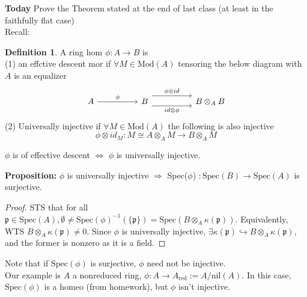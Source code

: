 \documentclass{article}
\theoremstyle{definition}
\theoremstyle{definition}
\newtheorem{definition}{Definition}[section]
\theoremstyle{remark}
\newcommand{\mk}[1]{\mathfrak{#1}}
\begin{document}
\textbf{Today} Prove the Theorem stated at the end of last class (at least in the faithfully flat case)\\

Recall: 
\begin{definition}
	A ring hom $\phi: A \to B$ is \\
	\indent(1) an effctive descent mor if $\forall M \in \text{Mod}(A)$ tensoring the below diagram with $A$ is an equalizer
\[\begin{tikzcd}
	A && B && {B \otimes_A B}
	\arrow["\phi", from=1-1, to=1-3]
	\arrow["{\phi \otimes id}", shift left=3, from=1-3, to=1-5]
	\arrow["{id \otimes\phi}"', shift right=2, from=1-3, to=1-5]
\end{tikzcd}\]
\indent (2) Universally injective if $\forall M \in \text{Mod}(A)$ the following is also injective
\[\phi \otimes id_M: M \cong A \otimes_A M \to B \otimes_A M\]
\end{definition}

\begin{theo}{}{}
	$\phi$ is of effective descent $\Longleftrightarrow$ $\phi$ is universally injective.
\end{theo}

\textbf{Proposition:} $\phi$ is universally injective $\Longrightarrow$ Spec($\phi$) $: \text{Spec}(B) \to \text{Spec}(A)$ is surjective.

\begin{proof}
	STS that for all $\mk{p} \in \text{Spec}(A), \emptyset \neq \text{Spec}(\phi)^{-1}(\{\mk{p}\}) = \text{Spec}(B \otimes_A \kappa(\mk{p}))$.
	Equivalently, WTS $B \otimes_A \kappa(\mk{p}) \neq 0$. Since $\phi$ is universally injective, $\exists \kappa(\mk{p}) \hookrightarrow B \otimes_A\kappa(\mk{p})$, and the former is nonzero as it is a field.
\end{proof}

Note that if $\text{Spec}(\phi)$ is surjective, $\phi$ need not be injective.\\
Our example is $A$ a nonreduced ring, $\phi: A \to A_{\text{red}} := A/\text{nil}(A)$.
In this case, $\text{Spec}(\phi)$ is a homeo (from homework), but $\phi$ isn't injective.\\
\end{document}
